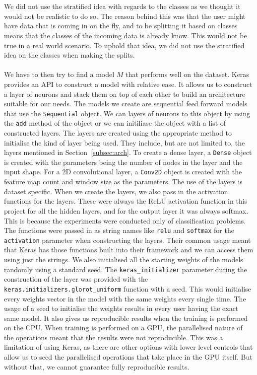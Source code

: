 \documentclass[12pt]{article}
\begin{document}
\\\\
We did not use the stratified idea with regards to the classes as we thought it would not be realistic to do so. The reason behind this was that the user might have data that is coming in on the fly, and to be splitting it based on classes means that the classes of the incoming data is already know. This would not be true in a real world scenario. To uphold that idea, we did not use the stratified idea on the classes when making the splits.
\\\\
We have to then try to find a model $M$ that performs well on the dataset. Keras provides an API to construct a model with relative ease. It allows us to construct a layer of neurons and stack them on top of each other to build an architecture suitable for our needs. The models we create are sequential feed forward models that use the \texttt{Sequential} object. We can layers of neurons to this object by using the \texttt{add} method of the object or we can initiliase the object with a list of constructed layers. The layers are created using the appropriate method to initialise the kind of layer being used. They include, but are not limited to, the layers mentioned in Section~\ref{subsec:arch}. To create a dense layer, a \texttt{Dense} object is created with the parameters being the number of nodes in the layer and the input shape. For a 2D convolutional layer, a \texttt{Conv2D} object is created with the feature map count and window size as the parameters. The use of the layers is dataset specific. When we create the layers, we also pass in the activation functions for the layers. These were always the ReLU activation function in this project for all the hidden layers, and for the output layer it was always softmax. This is because the experiments were conducted only of classification problems. The functions were passed in as string names like \texttt{relu} and \texttt{softmax} for the \texttt{activation} parameter when constructing the layers. Their common usage meant that Keras has those functions built into their framework and we can access them using just the strings. We also initialised all the starting weights of the models randomly using a standard seed. The \texttt{keras\_initializer} parameter during the construction of the layer was provided with the \texttt{keras.initializers.glorot\_uniform} function with a seed. This would initialise every weights vector in the model with the same weights every single time. The usage of a seed to initialise the weights results in every user having the exact same model. It also gives us reproducible results when the training is performed on the CPU. When training is performed on a GPU, the parallelised nature of the operations meant that the results were not reproducible. This was a limitation of using Keras, as there are other options with lower level controls that allow us to seed the parallelised operations that take place in the GPU itself. But without that, we cannot guarantee fully reproducible results.  
\end{document}
